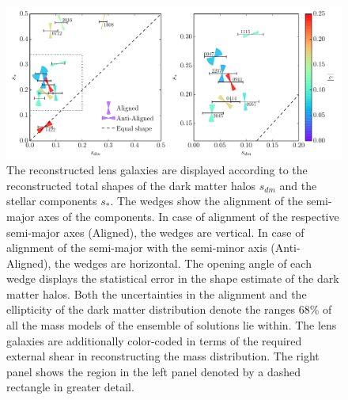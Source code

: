 \documentclass[useAMS,usenatbib]{mn2e}
\begin{document}
\begin{figure}
  \centering
  \includegraphics[width=\linewidth]{Figures/wedges_shears.pdf}
  \caption[width=\linewidth]{The reconstructed lens galaxies are displayed according to the reconstructed total shapes of the dark matter halos $s_{dm}$ and the stellar components $s_{*}$. The wedges show the alignment of the semi-major axes of the components. In case of alignment of the respective semi-major axes (Aligned), the wedges are vertical. In case of alignment of the semi-major with the semi-minor axis (Anti-Aligned), the wedges are horizontal. The opening angle of each wedge displays the statistical error in the shape estimate of the dark matter halos. Both the uncertainties in the alignment and the ellipticity of the dark matter distribution denote the ranges $68\%$ of all the mass models of the ensemble of solutions lie within. The lens galaxies are additionally color-coded in terms of the required external shear in reconstructing the mass distribution. The right panel shows the region in the left panel denoted by a dashed rectangle in greater detail.}
  \label{fig:wedgesall}
\end{figure}
\end{document}
